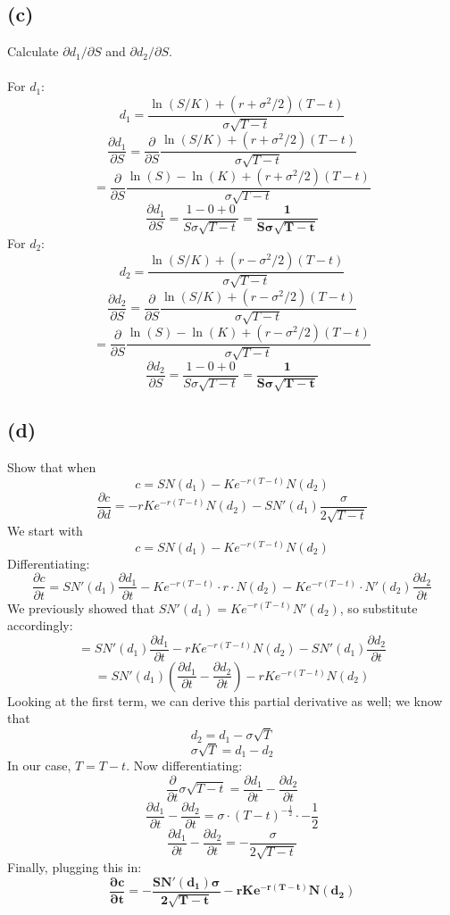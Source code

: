 \documentclass{article}
\begin{document}
{\subsection*{(c)}
Calculate \(\partial d_1 / \partial S\) and \(\partial d_2 / \partial S\). \\ \\
For \(d_1\):
\[
  d_1 = \frac{\ln(S / K) + (r + \sigma^2 / 2)(T - t)}{\sigma \sqrt{T - t}}
\]
\[
  \frac{\partial d_1}{\partial S} = \frac{\partial}{\partial S} \frac{\ln(S / K) + (r + \sigma^2 / 2)(T - t)}{\sigma \sqrt{T - t}}
\]
\[
  = \frac{\partial}{\partial S} \frac{\ln(S) - \ln(K) + (r + \sigma^2 / 2)(T - t)}{\sigma \sqrt{T - t}}
\]
\[
  \frac{\partial d_1}{\partial S} = \frac{1 - 0 + 0}{S \sigma \sqrt{T - t}} = \boxed{\mathbf{\frac{1}{S \sigma \sqrt{T - t}}}}
\]
For \(d_2\):
\[
  d_2 = \frac{\ln(S / K) + (r - \sigma^2 / 2)(T - t)}{\sigma \sqrt{T - t}}
\]
\[
  \frac{\partial d_2}{\partial S} = \frac{\partial}{\partial S} \frac{\ln(S / K) + (r - \sigma^2 / 2)(T - t)}{\sigma \sqrt{T - t}}
\]
\[
  = \frac{\partial}{\partial S} \frac{\ln(S) - \ln(K) + (r - \sigma^2 / 2)(T - t)}{\sigma \sqrt{T - t}}
\]
\[
  \frac{\partial d_2}{\partial S} = \frac{1 - 0 + 0}{S \sigma \sqrt{T - t}} = \boxed{\mathbf{\frac{1}{S \sigma \sqrt{T - t}}}}
\]

\subsection*{(d)}
Show that when 
\[
  c = SN(d_1) - Ke^{-r(T-t)} N(d_2)
\]
\[
  \frac{\partial c}{\partial d} = -r Ke^{-r(T - t)}N(d_2) - SN'(d_1) \frac{\sigma}{2 \sqrt{T - t}}
\]
We start with 
\[
  c = SN(d_1) - Ke^{-r(T-t)} N(d_2)
\]
Differentiating:
\[
  \frac{\partial c}{\partial t} = SN'(d_1) \frac{\partial d_1}{\partial t} - Ke^{-r(T-t)} \cdot r \cdot N(d_2) - Ke^{-r(T-t)} \cdot N'(d_2) \frac{\partial d_2}{\partial t}
\]
We previously showed that \(SN'(d_1) = Ke^{-r(T-t)}N'(d_2)\), so substitute accordingly:
\[
  = SN'(d_1) \frac{\partial d_1}{\partial t} - r Ke^{-r(T-t)} N(d_2) - S N'(d_1) \frac{\partial d_2}{\partial t}
\]
\[
  = SN'(d_1) (\frac{\partial d_1}{\partial t} - \frac{\partial d_2}{\partial t}) - r Ke^{-r(T-t)} N(d_2)
\]
Looking at the first term, we can derive this partial derivative as well; we know that 
\[
  d_2 = d_1 - \sigma \sqrt{T}
\]
\[
  \sigma \sqrt{T} = d_1 - d_2 
\]
In our case, \(T = T-t\). Now differentiating:
\[
  \frac{\partial}{\partial t} \sigma \sqrt{T - t} = \frac{\partial d_1}{\partial t} - \frac{\partial d_2}{\partial t}
\]
\[
  \frac{\partial d_1}{\partial t} - \frac{\partial d_2}{\partial t} = \sigma \cdot (T - t)^{-\frac{1}{2}} \cdot -\frac{1}{2}
\]
\[
  \frac{\partial d_1}{\partial t} - \frac{\partial d_2}{\partial t} = - \frac{\sigma}{2 \sqrt{T - t}}
\]
Finally, plugging this in:
\[
  \boxed{\mathbf{\frac{\partial c}{\partial t} = - \frac{SN'(d_1) \sigma}{2 \sqrt{T - t}} - r Ke^{-r(T-t)} N(d_2)}}
\]

}
\end{document}
